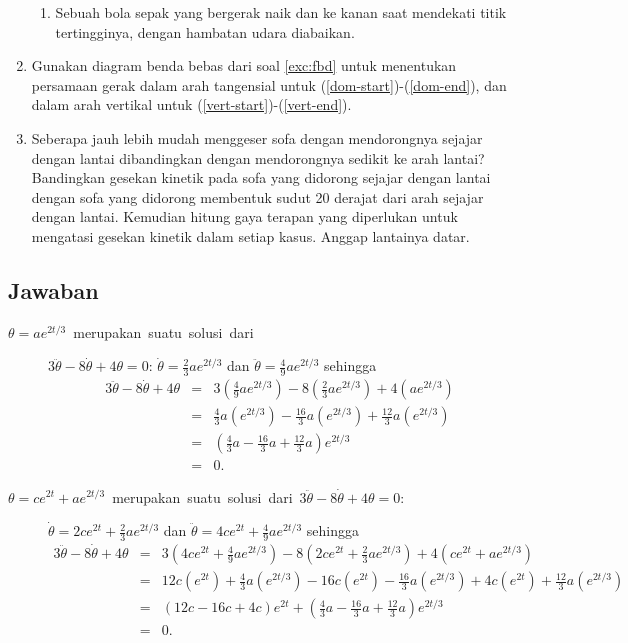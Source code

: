 \begin{enumerate}
\begin{enumerate}
\item \label{vert-end}Sebuah bola sepak yang bergerak naik dan ke kanan
saat mendekati titik tertingginya, dengan hambatan udara diabaikan.
\end{enumerate}
\item \label{exc:odePendulum-34}Gunakan diagram benda bebas dari soal \ref{exc:fbd}
untuk menentukan persamaan gerak dalam arah tangensial untuk (\ref{dom-start})-(\ref{dom-end}),
dan dalam arah vertikal untuk (\ref{vert-start})-(\ref{vert-end}). \haspartwithsolution  \haspartwithanswer 
\item \label{exc:odePendulum-33}Seberapa jauh lebih mudah menggeser sofa
dengan mendorongnya sejajar dengan lantai dibandingkan dengan mendorongnya
sedikit ke arah lantai? Bandingkan gesekan kinetik pada sofa yang
didorong sejajar dengan lantai dengan sofa yang didorong membentuk
sudut 20 derajat dari arah sejajar dengan lantai. Kemudian hitung
gaya terapan yang diperlukan untuk mengatasi gesekan kinetik dalam
setiap kasus. Anggap lantainya datar. \hasananswer 
\end{enumerate}
\finishexercises 

\subsection*{Jawaban}
\begin{description}
\item [{\label{odeMoreSolutions}$\theta=ae^{2t/3}$\ merupakan\ suatu\ solusi\ dari}] $3\ddot{\theta}-8\dot{\theta}+4\theta=0$:
$\dot{\theta}=\frac{2}{3}ae^{2t/3}$ dan $\ddot{\theta}=\frac{4}{9}ae^{2t/3}$
sehingga 
\begin{eqnarray*}
3\ddot{\theta}-8\dot{\theta}+4\theta & = & 3\left(\frac{4}{9}ae^{2t/3}\right)-8\left(\frac{2}{3}ae^{2t/3}\right)+4\left(ae^{2t/3}\right)\\
 & = & \frac{4}{3}a(e^{2t/3})-\frac{16}{3}a(e^{2t/3})+\frac{12}{3}a(e^{2t/3})\\
 & = & \left(\frac{4}{3}a-\frac{16}{3}a+\frac{12}{3}a\right)e^{2t/3}\\
 & = & 0.
\end{eqnarray*}
\item [{\label{odeEvenMoreSolutions}$\theta=ce^{2t}+ae^{2t/3}$\ merupakan\ suatu\ solusi\ dari\ $3\ddot{\theta}-8\dot{\theta}+4\theta=0$:}] $\dot{\theta}=2ce^{2t}+\frac{2}{3}ae^{2t/3}$
dan $\ddot{\theta}=4ce^{2t}+\frac{4}{9}ae^{2t/3}$ sehingga 
\begin{eqnarray*}
3\ddot{\theta}-8\dot{\theta}+4\theta & = & 3\left(4ce^{2t}+\frac{4}{9}ae^{2t/3}\right)-8\left(2ce^{2t}+\frac{2}{3}ae^{2t/3}\right)+4\left(ce^{2t}+ae^{2t/3}\right)\\
 & = & 12c(e^{2t})+\frac{4}{3}a(e^{2t/3})-16c(e^{2t})-\frac{16}{3}a(e^{2t/3})+4c(e^{2t})+\frac{12}{3}a(e^{2t/3})\\
 & = & (12c-16c+4c)e^{2t}+\left(\frac{4}{3}a-\frac{16}{3}a+\frac{12}{3}a\right)e^{2t/3}\\
 & = & 0.
\end{eqnarray*}
\end{description}


